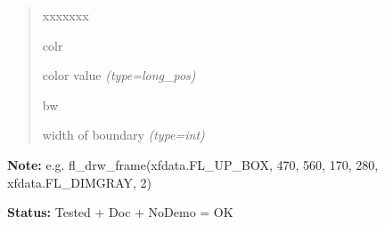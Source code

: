 \begin{boxedminipage}{\funcwidth}
\begin{quote}
\begin{Ventry}{xxxxxxx}
          \item[colr]


color value
            {\it (type=long\_pos)}

          \item[bw]


width of boundary
            {\it (type=int)}

        \end{Ventry}

      \end{quote}

\textbf{Note:} 
e.g. fl\_drw\_frame(xfdata.FL\_UP\_BOX, 470, 560, 170, 280,
xfdata.FL\_DIMGRAY, 2)


\textbf{Status:} 
Tested + Doc + NoDemo = OK


    \end{boxedminipage}

    \label{xformslib:flxbasic:fl_drw_checkbox}

    \vspace{0.5ex}

